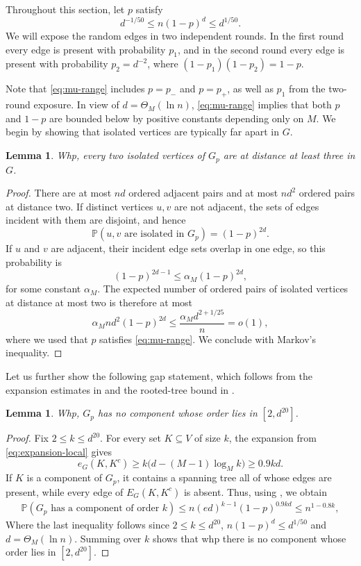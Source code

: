\documentclass[10pt,a4paper]{article}
\newtheorem{lemma}[thm]{Lemma}
\begin{document}
Throughout this section, let $p$ satisfy
\begin{equation}\label{eq:mu-range}
  d^{-1/50}\le n(1-p)^d\le d^{1/50}.
\end{equation}
We will expose the random edges in two independent rounds.
In the first round every edge is present with probability $p_1$, and in the second round every edge is present with probability $p_2=d^{-2}$, where $(1-p_1)(1-p_2)=1-p$.

Note that \eqref{eq:mu-range} includes $p=p_-$ and $p=p_+$, as well as $p_1$ from the two-round exposure.
In view of $d=\Theta_M(\ln n)$, \eqref{eq:mu-range} implies that both $p$ and $1-p$ are bounded below by positive constants depending only on $M$.
We begin by showing that isolated vertices are typically far apart in $G$.

\begin{lemma}\label{lem:isolates-far}
Whp, every two isolated vertices of $G_p$ are at distance at least three in $G$.
\end{lemma}

\begin{proof}
There are at most $nd$ ordered adjacent pairs and at most $nd^2$ ordered pairs at distance two.
If distinct vertices $u,v$ are not adjacent, the sets of edges incident with them are disjoint, and hence
\[
  \mathbb{P}(u,v\text{ are isolated in }G_p)=(1-p)^{2d}.
\]
If $u$ and $v$ are adjacent, their incident edge sets overlap in one edge, so this probability is
\[
  (1-p)^{2d-1}\le \alpha_M(1-p)^{2d},
\]
for some constant $\alpha_M$.
The expected number of ordered pairs of isolated vertices at distance at most two is therefore at most
\[
  \alpha_M nd^2(1-p)^{2d}   \le \frac{\alpha_M d^{2+1/25}}{n}=o(1),
\]
where we used that $p$ satisfies \eqref{eq:mu-range}.
We conclude with Markov's inequality.
\end{proof}

Let us further show the following gap statement, which follows from the expansion estimates in  and the rooted-tree bound in .

\begin{lemma}\label{lem:component-gap}
Whp, $G_p$ has no component whose order lies in $[2,d^{20}]$.
\end{lemma}

\begin{proof}
Fix $2\le k\le d^{20}$.
For every set $K\subseteq V$ of size $k$, the expansion from \eqref{eq:expansion-local} gives
\[
  e_G(K,K^c)\ge k\bigl(d-(M-1)\log_Mk\bigr)\ge0.9kd.
\]
If $K$ is a component of $G_p$, it contains a spanning tree all of whose edges are present, while every edge of $E_G(K,K^c)$ is absent.
Thus, using , we obtain
\begin{align*}
  \mathbb{P}(G_p\text{ has a component of order }k)
  \le n(ed)^{k-1}(1-p)^{0.9kd} \le n^{1-0.8k},
\end{align*}
Where the last inequality follows since $2\le k\le d^{20}$,  $n (1-p)^d\le d^{1/50}$ and $d=\Theta_M(\ln n)$.
Summing over $k$ shows that whp there is no component whose order lies in $[2, d^{20}]$.
\end{proof}
\end{document}
